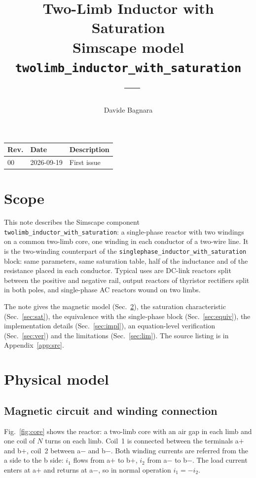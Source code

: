 \documentclass[11pt,a4paper]{article}
\title{Two-Limb Inductor with Saturation\\[1mm]
  \large Simscape model \texttt{twolimb\_inductor\_with\_saturation}\\[3mm]
  \normalsize \docrev\ --- \docdate}
\author{Davide Bagnara}
\date{}
\begin{document}
\maketitle
\thispagestyle{fancy}

\begin{center}
\small
\begin{tabular}{@{}lll@{}}
\toprule
Rev. & Date & Description \\
\midrule
00 & 2026-09-19 & First issue \\
\bottomrule
\end{tabular}
\end{center}
\vspace{2mm}

\section{Scope}

This note describes the Simscape component \texttt{twolimb\_inductor\_with\_saturation}: a
single-phase reactor with two windings on a common two-limb core, one winding in each
conductor of a two-wire line. It is the two-winding counterpart of the
\texttt{singlephase\_inductor\_with\_saturation} block: same parameters, same saturation
table, half of the inductance and of the resistance placed in each conductor. Typical
uses are DC-link reactors split between the positive and negative rail, output reactors
of thyristor rectifiers split in both poles, and single-phase AC reactors wound on two
limbs.

The note gives the magnetic model (Sec.~\ref{sec:phys}), the saturation characteristic
(Sec.~\ref{sec:sat}), the equivalence with the single-phase block
(Sec.~\ref{sec:equiv}), the implementation details (Sec.~\ref{sec:impl}), an
equation-level verification (Sec.~\ref{sec:ver}) and the limitations
(Sec.~\ref{sec:lim}). The source listing is in Appendix~\ref{app:src}.

\section{Physical model}
\label{sec:phys}

\subsection{Magnetic circuit and winding connection}

Fig.~\ref{fig:core} shows the reactor: a two-limb core with an air gap in each limb and
one coil of $N$ turns on each limb. Coil~1 is connected between the terminals a$+$ and
b$+$, coil~2 between a$-$ and b$-$. Both winding currents are referred from the a side to
the b side: $i_1$ flows from a$+$ to b$+$, $i_2$ from a$-$ to b$-$. The load current
enters at a$+$ and returns at a$-$, so in normal operation $i_1 = -i_2$.
\end{document}
